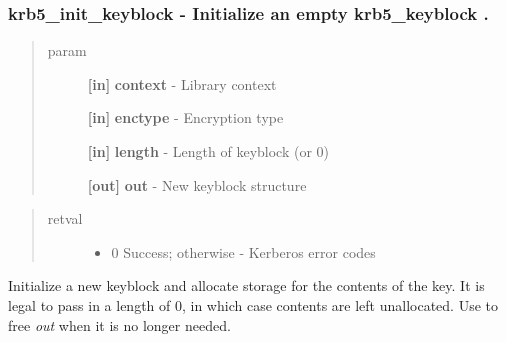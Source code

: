 \documentclass[letterpaper,10pt,english]{sphinxmanual}
\begin{document}
\subsubsection{krb5\_init\_keyblock -  Initialize an empty krb5\_keyblock .}
\label{appdev/refs/api/krb5_init_keyblock:krb5-init-keyblock-initialize-an-empty-krb5-keyblock}\label{appdev/refs/api/krb5_init_keyblock::doc}

\begin{fulllineitems}
\label{appdev/refs/api/krb5_init_keyblock:krb5_init_keyblock}
\end{fulllineitems}

\begin{quote}\begin{description}
\item[{param}] \leavevmode
\textbf{{[}in{]}} \textbf{context} - Library context

\textbf{{[}in{]}} \textbf{enctype} - Encryption type

\textbf{{[}in{]}} \textbf{length} - Length of keyblock (or 0)

\textbf{{[}out{]}} \textbf{out} - New keyblock structure

\end{description}\end{quote}
\begin{quote}\begin{description}
\item[{retval}] \leavevmode\begin{itemize}
\item {} 
0   Success; otherwise - Kerberos error codes

\end{itemize}

\end{description}\end{quote}

Initialize a new keyblock and allocate storage for the contents of the key. It is legal to pass in a length of 0, in which case contents are left unallocated. Use {\hyperref[appdev/refs/api/krb5_free_keyblock:krb5_free_keyblock]{}} to free \emph{out} when it is no longer needed.
\end{document}

